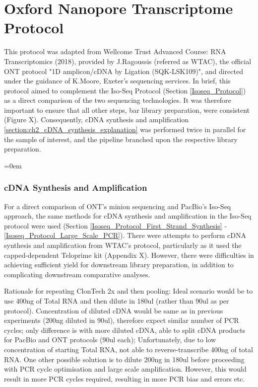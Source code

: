 \chapter{Oxford Nanopore Transcriptome Protocol}


This protocol was adapted from Wellcome Trust Advanced Course: RNA Transcriptomics (2018), provided by J.Ragoussis (referred as WTAC), the official ONT protocol "1D amplicon/cDNA by Ligation (SQK-LSK109)", and directed under the guidance of K.Moore, Exeter's sequencing services. In brief, this protocol aimed to complement the Iso-Seq Protocol (Section \ref{Isoseq_Protocol}) as a direct comparison of the two sequencing technologies. It was therefore important to ensure that all other steps, bar library preparation, were consistent (Figure X). Consequently, cDNA synthesis and amplification \ref{section:ch2_cDNA_synthesis_explanation} was performed twice in parallel for the sample of interest, and the pipeline branched upon the respective library preparation.   

\begingroup
\parindent=0em
\localtableofcontents 
\endgroup

\subsection{cDNA Synthesis and Amplification}
For a direct comparison of ONT's minion sequencing and PacBio's Iso-Seq approach, the same methods for cDNA synthesis and amplification in the Iso-Seq protocol were used (Section \ref{Isoseq_Protocol_First_Strand_Synthesis} - \ref{Isoseq_Protocol_Large_Scale_PCR}). There were attempts to perform cDNA synthesis and amplification from WTAC's protocol, particularly as it used the capped-dependent Teloprime kit (Appendix X). However, there were difficulties in achieving sufficient yield for downstream library preparation, in addition to complicating downstream comparative analyses.

Rationale for repeating ClonTech 2x and then pooling: Ideal scenario would be to use 400ng of Total RNA and then dilute in 180ul (rather than 90ul as per protocol). Concentration of diluted cDNA would be same as in previous experiments (200ng diluted in 90ul), therefore expect similar number of PCR cycles; only difference is with more diluted cDNA, able to split cDNA products for PacBio and ONT protocols (90ul each); Unfortunately, due to low concentration of starting Total RNA, not able to reverse-transcribe 400ng of total RNA. One other possible solution is to dilute 200ng in 180ul before proceeding with PCR cycle optimisation and large scale amplification. However, this would result in more PCR cycles required, resulting in more PCR bias and errors etc.   

